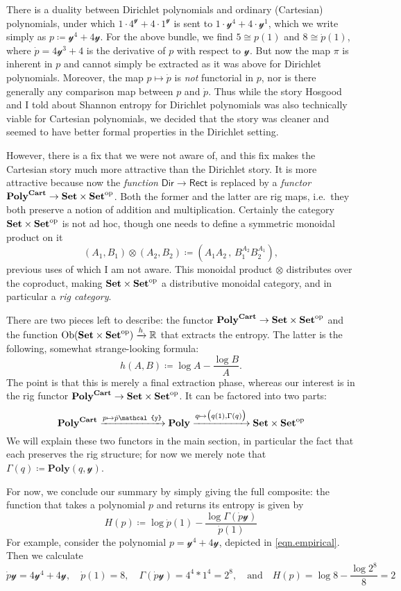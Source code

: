 \documentclass[11pt, one side, article]{memoir}
\theoremstyle{definition}
\theoremstyle{plain}
\DeclareMathOperator{\ob}{Ob}
\newcommand{\Set}[1]{\mathsf{#1}}%
\newcommand{\Cat}[1]{\mathbf{#1}}%
\newcommand{\To}[2][]{\xrightarrow[#1]{#2}}
\newcommand{\op}{^\tn{op}}
\newcommand{\tn}[1]{\textnormal{#1}}
\newcommand{\rr}{\mathbb{R}}
\newcommand{\smset}{\Cat{Set}}
\newcommand{\yon}{\mathcal{y}}
\newcommand{\poly}{\Cat{Poly}}
\newcommand{\dir}{\Set{Dir}}
\newcommand{\rect}{\Set{Rect}}
\newcommand{\polycart}{\poly^{\Cat{Cart}}}
\newcommand{\0}{\textsf{0}}
\newcommand{\1}{\tn{\textsf{1}}}
\newcommand{\qand}{\quad\text{and}\quad}
\begin{document}
There is a duality \cite[Section 4]{spivak2020dirichlet} between Dirichlet polynomials and ordinary (Cartesian) polynomials, under which $1\cdot 4^\yon+4\cdot 1^\yon$ is sent to $1\cdot\yon^4+4\cdot\yon^1$, which we write simply as $p\coloneqq\yon^4+4\yon$. For the above bundle, we find $5\cong p(1)$ and $8\cong\dot{p}(1)$, where $\dot{p}=4\yon^3+4$ is the derivative of $p$ with respect to $\yon$. But now the map $\pi$ is inherent in $p$ and cannot simply be extracted as it was above for Dirichlet polynomials. Moreover, the map $p\mapsto\dot{p}$ is \emph{not} functorial in $p$, nor is there generally any comparison map between $p$ and $\dot{p}$. Thus while the story Hosgood and I told about Shannon entropy for Dirichlet polynomials was also technically viable for Cartesian polynomials, we decided that the story was cleaner and seemed to have better formal properties in the Dirichlet setting.

However, there is a fix that we were not aware of, and this fix makes the Cartesian story much more attractive than the Dirichlet story. It is more attractive because now the \emph{function} $\dir\to\rect$ is replaced by a \emph{functor} $\polycart\to\smset\times\smset\op$. Both the former and the latter are rig maps, i.e.\ they both preserve a notion of addition and multiplication. Certainly the category $\smset\times\smset\op$ is not ad hoc, though one needs to define a symmetric monoidal product on it
\[
	(A_1,B_1)\otimes(A_2,B_2)\coloneqq\left(A_1A_2\,,\,B_1^{A_2}B_2^{A_1}\right),
\]
previous uses of which I am not aware. This monoidal product $\otimes$ distributes over the coproduct, making $\smset\times\smset\op$ a distributive monoidal category, and in particular a \emph{rig category}.

There are two pieces left to describe: the functor $\polycart\to\smset\times\smset\op$ and the function $\ob(\smset\times\smset\op)\To{h}\rr$ that extracts the entropy. The latter is the following, somewhat strange-looking formula:
\[
h(A,B)\coloneqq\log A - \frac{\log B}{A}.
\]
The point is that this is merely a final extraction phase, whereas our interest is in the rig functor $\polycart\to\smset\times\smset\op$. It can be factored into two parts:
\[
\polycart\To{p\mapsto\dot{p}\yon}\poly\To{q\mapsto\big(q(1),\Gamma(q)\big)}\smset\times\smset\op
\]
We will explain these two functors in the main section, in particular the fact that each preserves the rig structure; for now we merely note that $\Gamma(q)\coloneqq\poly(q,\yon)$.

For now, we conclude our summary by simply giving the full composite: the function that takes a polynomial $p$ and returns its entropy is given by
\[
  H(p)\coloneqq\log \dot{p}(1)-\frac{\log\Gamma(\dot{p}\yon)}{\dot{p}(1)}
\]
For example, consider the polynomial $p=\yon^4+4\yon$, depicted in \eqref{eqn.empirical}. Then we calculate
\[
\dot{p}\yon=4\yon^4+4\yon
,\quad
\dot{p}(1)=8
,\quad
\Gamma(\dot{p}\yon)=4^4*1^4=2^8
,\qand 
H(p)=\log 8-\frac{\log 2^8}{8}=2
\]
\end{document}

